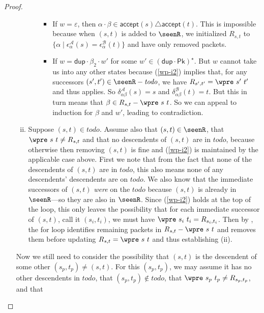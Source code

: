 \documentclass[acmsmall,dvipsnames,nonacm]{acmart}
\newcommand\todoR{\textit{todo}}
\newcommand\Pk{\mathsf{Pk}}
\newcommand\pk{\alpha}
\newcommand\pkp{\beta}
\newcommand\dup{\mathsf{dup}}
\newcommand\accept{\mathsf{accept}}
\newcommand\A{\mathcal{A}}
\newcommand\B{\mathcal{B}}
\newcommand\epsA{\epsilon^\A_\pk}
\newcommand\epsB{\epsilon^\B_\pk}
\newcommand\delA{\delta^\A_{\pk\pkp}}
\newcommand\delB{\delta^\B_{\pk\pkp}}
\begin{document}
\begin{proof}
\begin{itemize}
\begin{enumerate}[(i)]
\begin{enumerate}
            \begin{itemize}
              \item  If $w = \varepsilon$, then $\pk\cdot\pkp\in
                \accept(s)\triangle\accept(t)$. This is impossible because when
                $(s,t)$ is added to $\seenR$, we initialized $R_{s,t}$ to $\{\pk
                \mid \epsA(s) = \epsB(t) \}$ and have only removed packets.
                  \item  If $w = \dup\cdot \pkp_2 \cdot w'$ for some $w' \in
                    (\dup\cdot\Pk)^\star$. But $w$ cannot take us into any other
                    states because (\ref{wp-i2}) implies that, for any
                    successors $(s',t')\in \seenR - \todoR$, we have $R_{s',t'}
                    = \wpre\ s'\ t'$ and thus  applies.
                    So $\delA(s) = s$ and $\delB(t) = t$. But this in turn means
                    that $\pkp\in R_{s,t} - \wpre\ s\ t$. So we can appeal to
                    induction for $\pkp$ and $w'$, leading to contradiction.
            \end{itemize}
        \end{enumerate}
%
        \item Suppose $(s,t) \in \todoR$. Assume also that $(s,t)\in\seenR$,
        that $\wpre\ s\ t \neq R_{s,t}$ and that no descendents of $(s,t)$ are
        in $\todoR$, because otherwise then removing $(s,t)$ is fine and
        (\ref{wp-i2}) is maintained by the applicable case above. First we note
        that from the fact that none of the descendents of $(s,t)$ are in
        $\todoR$, this also means none of any descendents' descendents are on
        $\todoR$. We also know that the immediate successors of $(s,t)$
        \emph{were} on the $\todoR$ because $(s,t)$ is already in $\seenR$---so
        they are also in $\seenR$. Since (\ref{wp-i2}) holds at the
        top of the loop, this only leaves the possibility that for each
        immediate successor of $(s,t)$, call it $(s_i, t_i)$, we must have
        $\wpre\ s_i\ t_i = R_{s_i,t_i}$. Then by , the for loop
        identifies remaining packets in $R_{s,t} - \wpre\ s\ t$ and removes
        them before updating $R_{s,t} = \wpre\ s\ t$ and thus establishing (ii).
    \end{enumerate}
%
    Now we still need to consider the possibility that $(s,t)$ is the
    descendent of some other $(s_p, t_p) \neq (s,t)$. For this $(s_p, t_p)$, we
    may assume it has no other descendents in $\todoR$, that $(s_p,
    t_p)\notin\todoR$, that $\wpre\ s_p\ t_p \neq R_{s_p,t_p}$, and that

\end{itemize}
\end{proof}
\end{document}
